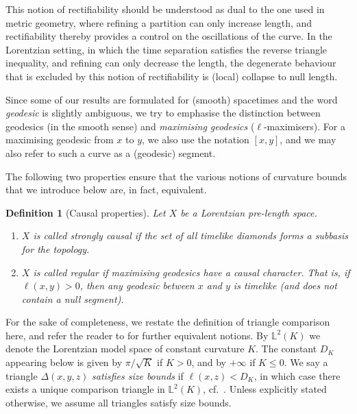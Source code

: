 \documentclass[hidelinks,12pt,a4paper]{article}
\numberwithin{equation}{section}
\theoremstyle{plain}
\newtheorem{definition}{Definition}[section]
\theoremstyle{definition}
\newcommand{\lm}[1]{\mathbb{L}^2(#1)}
\newcommand{\LpLSn}{Lo\-rentz\-ian pre-length space}
\begin{document}
This notion of rectifiability should be understood as dual to the one used in metric geometry, where refining a partition can only increase length, and rectifiability thereby provides a control on the oscillations of the curve. In the Lorentzian setting, in which the time separation satisfies the reverse triangle inequality, and refining can only decrease the length, the degenerate behaviour that is excluded by this notion of rectifiability is (local) collapse to null length.

Since some of our results are formulated for (smooth) spacetimes and the word \emph{geodesic} is slightly ambiguous, we try to emphasise the distinction between geodesics (in the smooth sense) and \emph{maximising geodesics} ($\ell$-maximisers). 
For a maximising geodesic from $x$ to $y$, we also use the notation $[x,y]$, and we may also refer to such a curve as a (geodesic) segment. 

The following two properties ensure that the various notions of curvature bounds that we introduce below are, in fact, equivalent.

\begin{definition}[Causal properties]
\label{def: causal properties}
Let $X$ be a \LpLSn. 
\begin{enumerate}
\item $X$ is called \emph{strongly causal} if the set of all timelike diamonds forms a subbasis for the topology. 
\item $X$ is called \emph{regular} if maximising geodesics have a causal character. 
That is, if $\ell(x,y) > 0$, then any geodesic between $x$ and $y$ is timelike (and does not contain a null segment). 
\end{enumerate}
\end{definition}

For the sake of completeness, we restate the definition of triangle comparison here, and refer the reader to \cite{BKR24, BR25+} for further equivalent notions.
By $\lm{K}$ we denote the Lorentzian model space of constant curvature $K$. 
The constant $D_K$ appearing below is given by $\pi/\sqrt{K}$ if $K > 0$, and by $+ \infty$ if $K \leq 0$. 
We say a triangle $\Delta(x,y,z)$ \emph{satisfies size bounds} if $\ell(x,z) < D_K$, in which case there exists a unique comparison triangle in $\lm{K}$, cf.\ \cite[Lemma 2.1]{AB08}. 
Unless explicitly stated otherwise, we assume all triangles satisfy size bounds.
\end{document}

